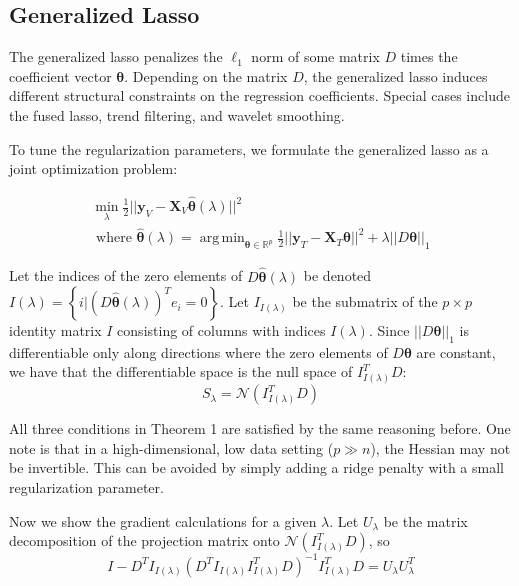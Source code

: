 \documentclass[10pt,letterpaper]{article}
\DeclareMathOperator*{\argmin}{arg\,min}
\begin{document}
\subsection{Generalized Lasso}
The generalized lasso \citep{roth2004generalized} penalizes the $\ell_1$ norm of some matrix $D$ times the coefficient vector $\boldsymbol \theta$. Depending on the matrix $D$, the generalized lasso induces different structural constraints on the regression coefficients. Special cases include the fused lasso, trend filtering, and wavelet smoothing.

To tune the regularization parameters, we formulate the generalized lasso as a joint optimization problem:

\begin{equation}
\begin{array}{c}
\min_{\lambda} \frac{1}{2} \lvert\lvert \boldsymbol{y}_V - \boldsymbol{X}_V \hat{\boldsymbol{\theta}} (\lambda) \rvert\rvert ^2 \\
\text{ where }
\hat{\boldsymbol{\theta}} (\lambda) =
\argmin_{\boldsymbol{\theta} \in \mathbb{R}^p}
\frac{1}{2} \lvert\lvert \boldsymbol{y}_T - \boldsymbol{X}_T \boldsymbol{\theta} \rvert\rvert ^2
+ \lambda \lvert\lvert D \boldsymbol{\theta} \rvert \rvert_1
\end{array}
\label{genlasso}
\end{equation}

Let the indices of the zero elements of $D \hat{\boldsymbol{\theta}}(\lambda)$ be denoted $I(\lambda) = \left \{i | (D \hat{\boldsymbol{\theta}}(\lambda))^T e_i = 0 \right \}$.
Let $I_{I(\lambda)}$ be the submatrix of the $p \times p$ identity matrix $I$ consisting of columns with indices $I(\lambda)$. Since $||D \boldsymbol{\theta}||_1$ is differentiable only along directions where the zero elements of $D \boldsymbol{\theta}$ are constant, we have that the differentiable space is the null space of $I_{I(\lambda)}^T D$:
\begin{equation}
S_\lambda = \mathcal{N}(I_{I(\lambda)}^T D)
\end{equation}

All three conditions in Theorem 1 are satisfied by the same reasoning before. One note is that in a high-dimensional, low data setting ($p \gg n$), the Hessian may not be invertible. This can be avoided by simply adding a ridge penalty with a small regularization parameter.

Now we show the gradient calculations for a given $\lambda$. Let $U_\lambda$ be the matrix decomposition of the projection matrix onto $\mathcal{N}(I_{I(\lambda)}^T D)$, so
\begin{equation}
I - D^T I_{I(\lambda)} \left ( D^T I_{I(\lambda)} I_{I(\lambda)}^T D\right )^{-1} I_{I(\lambda)}^T D = U_\lambda U_\lambda^T
\end{equation}
\end{document}
